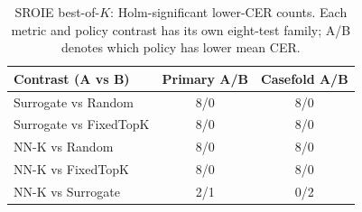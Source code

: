 \begin{table}[H]
\centering
\caption{SROIE best-of-$K$: Holm-significant lower-CER counts. Each metric and policy contrast has its own eight-test family; A/B denotes which policy has lower mean CER.}
\label{tab:sroie_casefold_counts}
\small
\begin{tabular}{lcc}
\toprule
Contrast (A vs B) & Primary A/B & Casefold A/B \\
\midrule
Surrogate vs Random & 8/0 & 8/0 \\
Surrogate vs FixedTopK & 8/0 & 8/0 \\
NN-K vs Random & 8/0 & 8/0 \\
NN-K vs FixedTopK & 8/0 & 8/0 \\
NN-K vs Surrogate & 2/1 & 0/2 \\
\bottomrule
\end{tabular}
\end{table}

\begin{table}[H]
\centering
\caption{NN-K minus Surrogate on SROIE (CER percentage points). CS: primary case-sensitive metric; CF: casefold. CIs are paired percentile bootstrap 95\% intervals per comparison, not multiplicity-adjusted; $p_H$ is Holm-adjusted separately within each metric's eight-test family.}
\label{tab:sroie_casefold_nn}
\small
{}
\end{table}
